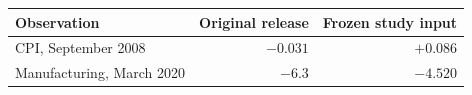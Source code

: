 \begin{tabular}{lrr}
\toprule
Observation & Original release & Frozen study input \\
\midrule
CPI, September 2008 & $-0.031$ & $+0.086$ \\
Manufacturing, March 2020 & $-6.3$ & $-4.520$ \\
\bottomrule
\end{tabular}
